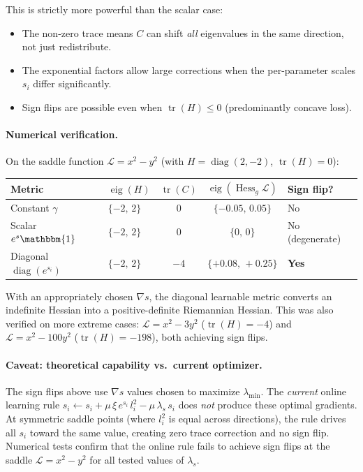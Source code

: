 \documentclass{article}
\newcommand{\loss}{\mathcal{L}}
\newcommand{\Id}{\mathbbm{1}}
\begin{document}
This is strictly more powerful than the scalar case:
\begin{itemize}[leftmargin=1.8em]
    \item The non-zero trace means $C$ can shift \emph{all} eigenvalues
          in the same direction, not just redistribute.
    \item The exponential factors allow large corrections
          when the per-parameter scales $s_i$ differ significantly.
    \item Sign flips are possible even when $\operatorname{tr}(H)\leq 0$
          (predominantly concave loss).
\end{itemize}

\paragraph{Numerical verification.}
On the saddle function $\loss = x^2 - y^2$
(with $H = \operatorname{diag}(2,-2)$, $\operatorname{tr}(H)=0$):
\begin{center}
\small
\begin{tabular}{@{}llccl@{}}
    \toprule
    \textbf{Metric} & $\operatorname{eig}(H)$ & $\operatorname{tr}(C)$
    & $\operatorname{eig}(\operatorname{Hess}_g\loss)$ & \textbf{Sign flip?} \\
    \midrule
    Constant $\gamma$ & $\{-2,\,2\}$ & $0$ & $\{-0.05,\,0.05\}$ & No \\
    Scalar $e^s\Id$   & $\{-2,\,2\}$ & $0$ & $\{0,\,0\}$ & No (degenerate) \\
    Diagonal $\operatorname{diag}(e^{s_i})$
                      & $\{-2,\,2\}$ & $-4$ & $\{+0.08,\,+0.25\}$ & \textbf{Yes} \\
    \bottomrule
\end{tabular}
\end{center}
With an appropriately chosen $\nabla s$, the diagonal learnable metric
converts an indefinite Hessian into a positive-definite Riemannian Hessian.
This was also verified on more extreme cases:
$\loss = x^2 - 3y^2$ ($\operatorname{tr}(H) = -4$)
and $\loss = x^2 - 100y^2$ ($\operatorname{tr}(H) = -198$),
both achieving sign flips.

\paragraph{Caveat: theoretical capability vs.\ current optimizer.}
The sign flips above use $\nabla s$ values chosen to maximize $\lambda_{\min}$.
The \emph{current} online learning rule
$s_i \leftarrow s_i + \mu\,\xi\,e^{s_i}\,l_i^2 - \mu\,\lambda_s\,s_i$
does \emph{not} produce these optimal gradients.
At symmetric saddle points (where $l_i^2$ is equal across directions),
the rule drives all $s_i$ toward the same value,
creating zero trace correction and no sign flip.
Numerical tests confirm that the online rule fails to achieve sign flips
at the saddle $\loss = x^2 - y^2$ for all tested values of $\lambda_s$.
\end{document}
